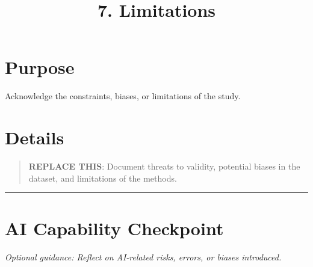 \documentclass[
]{report}
\title{7. Limitations}
\author{}
\date{}
\renewcommand*\contentsname{Table of contents}
\newcommand\contentsname{Table of contents}
\begin{document}
\maketitle

\renewcommand*\contentsname{Table of contents}
{
\hypersetup{linkcolor=}
\setcounter{tocdepth}{2}
\tableofcontents
}

\chapter{Purpose}\label{purpose}

Acknowledge the constraints, biases, or limitations of the study.

\chapter{Details}\label{details}

\begin{quote}
\textbf{REPLACE THIS}: Document threats to validity, potential biases in
the dataset, and limitations of the methods.
\end{quote}

\begin{center}\rule{0.5\linewidth}{0.5pt}\end{center}

\chapter{AI Capability Checkpoint}\label{ai-capability-checkpoint}

\emph{Optional guidance: Reflect on AI-related risks, errors, or biases
introduced.}
\end{document}
